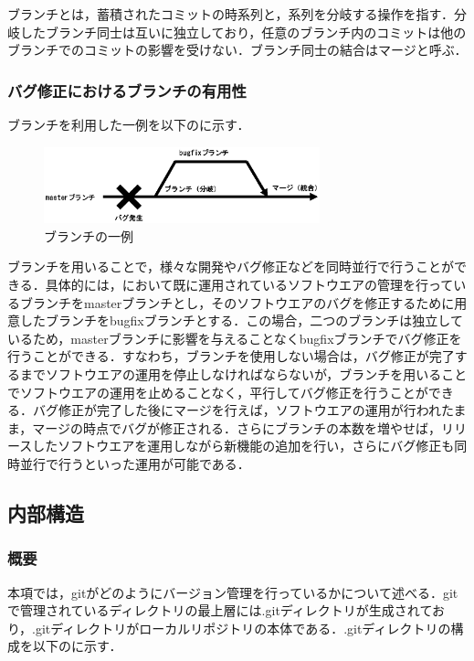 \documentclass[a4j,9pt,twocolumn]{jsarticle}
\begin{document}
ブランチとは，蓄積されたコミットの時系列と，系列を分岐する操作を指す．分岐したブランチ同士は互いに独立しており，任意のブランチ内のコミットは他のブランチでのコミットの影響を受けない．ブランチ同士の結合はマージと呼ぶ．

\subsubsection{バグ修正におけるブランチの有用性}
ブランチを利用した一例を以下のに示す．

\begin{figure}[h]
\centering
\includegraphics[width=80mm]{img/branch.eps}
\caption{ブランチの一例}
\label{branch_ex}
\end{figure}

ブランチを用いることで，様々な開発やバグ修正などを同時並行で行うことができる．具体的には，において既に運用されているソフトウエアの管理を行っているブランチをmasterブランチとし，そのソフトウエアのバグを修正するために用意したブランチをbugfixブランチとする．この場合，二つのブランチは独立しているため，masterブランチに影響を与えることなくbugfixブランチでバグ修正を行うことができる．すなわち，ブランチを使用しない場合は，バグ修正が完了するまでソフトウエアの運用を停止しなければならないが，ブランチを用いることでソフトウエアの運用を止めることなく，平行してバグ修正を行うことができる．バグ修正が完了した後にマージを行えば，ソフトウエアの運用が行われたまま，マージの時点でバグが修正される．さらにブランチの本数を増やせば，リリースしたソフトウエアを運用しながら新機能の追加を行い，さらにバグ修正も同時並行で行うといった運用が可能である．

\subsection{内部構造}
\subsubsection{概要}
本項では，gitがどのようにバージョン管理を行っているかについて述べる．gitで管理されているディレクトリの最上層には.gitディレクトリが生成されており，.gitディレクトリがローカルリポジトリの本体である．.gitディレクトリの構成を以下のに示す．
\end{document}
